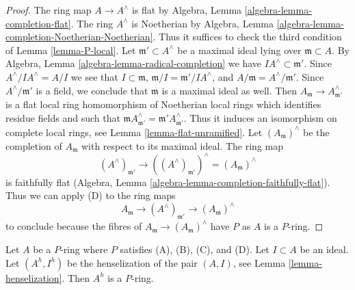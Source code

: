 \begin{proof}
The ring map $A \to A^\wedge$ is flat by
Algebra, Lemma \ref{algebra-lemma-completion-flat}.
The ring $A^\wedge$ is Noetherian by
Algebra, Lemma \ref{algebra-lemma-completion-Noetherian-Noetherian}.
Thus it suffices to check the third condition of
Lemma \ref{lemma-P-local}.
Let $\mathfrak m' \subset A^\wedge$ be a maximal ideal lying over
$\mathfrak m \subset A$.
By Algebra, Lemma \ref{algebra-lemma-radical-completion}
we have $IA^\wedge \subset \mathfrak m'$.
Since $A^\wedge/IA^\wedge = A/I$ we see that
$I \subset \mathfrak m$, $\mathfrak m/I = \mathfrak m'/IA^\wedge$, and
$A/\mathfrak m = A^\wedge/\mathfrak m'$. Since $A^\wedge/\mathfrak m'$
is a field, we conclude that $\mathfrak m$ is a maximal ideal as well.
Then $A_\mathfrak m \to A^\wedge_{\mathfrak m'}$ is a flat local
ring homomorphism of Noetherian local rings
which identifies residue fields and such that
$\mathfrak m A^\wedge_{\mathfrak m'} = \mathfrak m'A^\wedge_{\mathfrak m'}$.
Thus it induces an isomorphism on complete local rings, see
Lemma \ref{lemma-flat-unramified}.
Let $(A_\mathfrak m)^\wedge$ be the completion of $A_\mathfrak m$
with respect to its maximal ideal.
The ring map
$$
(A^\wedge)_{\mathfrak m'} \to
((A^\wedge)_{\mathfrak m'})^\wedge = (A_\mathfrak m)^\wedge
$$
is faithfully flat (Algebra, Lemma
\ref{algebra-lemma-completion-faithfully-flat}). Thus we can apply
(D) to the ring maps
$$
A_\mathfrak m \to (A^\wedge)_{\mathfrak m'} \to (A_\mathfrak m)^\wedge
$$
to conclude because the fibres of
$A_\mathfrak m \to (A_\mathfrak m)^\wedge$
have $P$ as $A$ is a $P$-ring.
\end{proof}

\begin{lemma}
\label{lemma-henselization-pair-P-ring}
Let $A$ be a $P$-ring where $P$ satisfies (A), (B), (C), and (D).
Let $I \subset A$ be an ideal. Let $(A^h, I^h)$ be the henselization
of the pair $(A, I)$, see Lemma \ref{lemma-henselization}.
Then $A^h$ is a $P$-ring.
\end{lemma}

